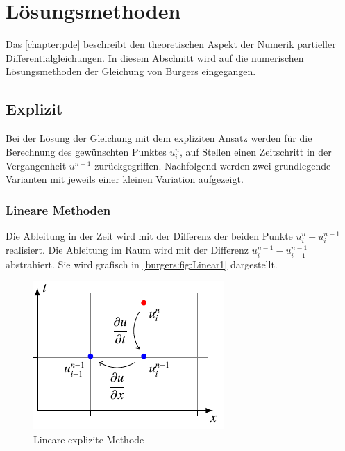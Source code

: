 %
%
\section{Lösungsmethoden
\label{burgers:section:loesung}}

Das \autoref{chapter:pde} beschreibt den theoretischen Aspekt der Numerik  partieller Differentialgleichungen.
In diesem Abschnitt wird auf die numerischen Lösungsmethoden der Gleichung von Burgers eingegangen.


\subsection{Explizit}

Bei der Lösung der Gleichung mit dem expliziten Ansatz werden für die Berechnung des gewünschten Punktes $u_i^n$, auf Stellen einen Zeitschritt in der Vergangenheit $u^{n-1}$ zurückgegriffen.
Nachfolgend werden zwei grundlegende Varianten mit jeweils einer kleinen Variation aufgezeigt.

\subsubsection{Lineare Methoden}

	Die Ableitung in der Zeit wird mit der Differenz der beiden Punkte $u_{i}^{n}-u_{i}^{n-1}$ realisiert.
	Die Ableitung im Raum wird mit der Differenz $u_{i}^{n-1}-u_{i-1}^{n-1}$ abstrahiert.
	Sie wird grafisch in \autoref{burgers:fig:Linear1} dargestellt.


	     \begin{figure}
		\centering
		\includegraphics[height=.4\textwidth]{papers/burgers/BurgersEquation/tikz/linear1/linear1.pdf}
		\caption{Lineare explizite Methode}
		\label{burgers:fig:Linear1}
		\end{figure}


